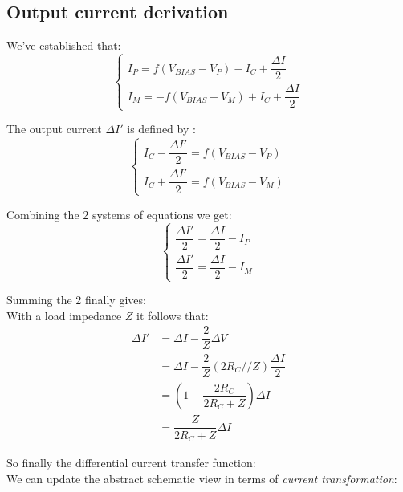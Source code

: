 \documentclass[10pt]{article}
\begin{document}
\subsection*{Output current derivation}
We've established that:
$$
\left\{
	\begin{array}{ll}
		I_P = f(V_{BIAS}-V_P) - I_C + \dfrac{\Delta I}{2}\\
		I_M = -f(V_{BIAS}-V_M) + I_C + \dfrac{\Delta I}{2}
	\end{array}
\right.
$$

The output current $\Delta I'$ is defined by :
$$
\left\{
	\begin{array}{ll}
		I_C - \dfrac{\Delta I'}{2} = f(V_{BIAS} - V_P)\\
		I_C + \dfrac{\Delta I'}{2} = f(V_{BIAS} - V_M)
	\end{array}
\right.
$$

Combining the 2 systems of equations we get:
$$
\left\{
	\begin{array}{ll}
		\dfrac{\Delta I'}{2} = \dfrac{\Delta I}{2} - I_P\\
		\dfrac{\Delta I'}{2} = \dfrac{\Delta I}{2} - I_M
	\end{array}
\right.
$$

Summing the 2 finally gives:
\\

With a load impedance $Z$ it follows that:
\begin{equation}
\begin{split}
\Delta I'	& = \Delta I - \dfrac{2}{Z} \Delta V \\
 			& = \Delta I - \dfrac{2}{Z} (2R_C // Z) \dfrac{\Delta I}{2}\\
			& = \left( 1 - \dfrac{2R_C}{2R_C + Z} \right) \Delta I\\
			& = \dfrac{Z}{2R_C + Z} \Delta I
\end{split}
\end{equation}

So finally the differential current transfer function:
\\

We can update the abstract schematic view in terms of \textit{current transformation}:
\end{document}
